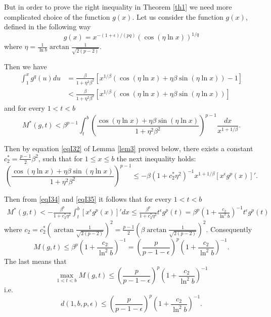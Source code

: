 \documentclass[10pt,a4paper]{amsart}
\numberwithin{equation}{section}
\begin{document}
But in order to prove the right inequality in Theorem \ref{th1} we need more complicated choice
of the function $g(x)$.
Let us consider the function $g(x)$, defined in the following way
\begin{equation*}\label{eq200}
g(x)=x^{-(1+\epsilon)/(pq)}\left(\cos(\eta\ln x) \right)^{1/q}
\end{equation*}
where $\eta=\frac{1}{\ln b}\arctan{\frac{1}{\sqrt{2(p-2)}}}$.

 Then we have
\begin{align*}
\int_1^xg^q(u)du&=\frac{\beta}{1+\eta^2\beta^2}\left[x^{1/\beta}(\cos(\eta\ln x)+\eta \beta\sin(\eta\ln x))-1 \right]\\
&<\frac{\beta}{1+\eta^2\beta^2}\left[x^{1/\beta}(\cos(\eta\ln x)+\eta \beta\sin(\eta\ln x))\right]\end{align*}
and for every $1< t< b$
\begin{equation}\label{eqI34}
M^*(g,t)<\beta^{p-1}\int_t^b\left(\frac{\cos(\eta\ln x)+\eta \beta\sin(\eta\ln x)}{1+\eta^2\beta^2} \right)^{p-1}
\frac{dx}{x^{1+1/\beta}}.
\end{equation}


Then by equation \eqref{eqI32} of Lemma \ref{lem3} proved below, there exists a constant $c_2^*= \frac{p-1}{2}\beta^2$, %
 such that for $1\le x\le b$
the next inequality holds:
\begin{equation}\label{eqI35}
\left(\frac{\cos(\eta\ln x)+\eta \beta\sin(\eta\ln x)}{1+\eta^2\beta^2} \right)^{p-1}\le
-\beta\left(1+c_2^*\eta^2 \right)^{-1}x^{1+1/\beta}\left[x^\epsilon g^p(x) \right]'.
\end{equation}

Then from  \eqref{eqI34} and  \eqref{eqI35} it follows that for every $1< t< b$
\begin{align*}
M^*(g,t)<-\frac{\beta^p}{1+c_2^*\eta^2}\int_t^b\left[x^\epsilon g^p(x) \right]'dx
\le \frac{\beta^p}{1+c_2^*\eta^2}t^\epsilon g^p(t)=\beta^p\left(1+\frac{c_2}{\ln^2b}\right)^{-1}t^\epsilon g^p(t)
\end{align*}
where $c_2=c_2^*\left(\arctan{\frac{1}{\sqrt{2(p-2)}}}\right)^2 = \frac{p-1}{2}\left(\beta\arctan{\frac{1}{\sqrt{2(p-2)}}}\right)^2$.
Consequently 
\[
M(g,t)\le  \beta^p\left(1+\frac{c_2}{\ln^2b}\right)^{-1}
=\left(\frac{p}{p-1-\epsilon} \right)^p  \left(1+\frac{c_2}{\ln^2 b}\right)^{-1}.
\]
The last means that 
\[
\max_{1< t< b}M(g,t)\le 
\left(\frac{p}{p-1-\epsilon} \right)^p  \left(1+\frac{c_2}{\ln^2 b}\right)^{-1}
\]
i.e.
\[
 d(1,b,p,\epsilon)\le \left(\frac{p}{p-1-\epsilon} \right)^p  \left(1+\frac{c_2}{\ln^2 b}\right)^{-1}.
\]
\end{document}
